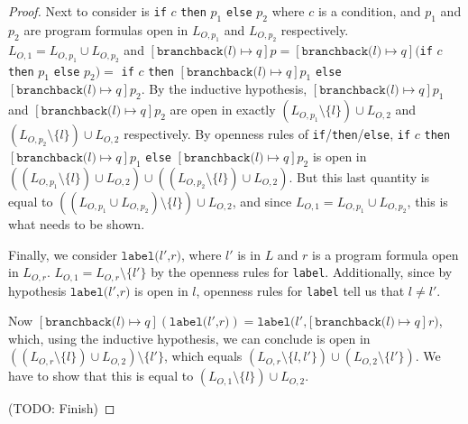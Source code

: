 \documentclass[11pt]{article}
\begin{document}
\begin{proof}
Next to consider is \texttt{if} $c$ \texttt{then} $p_{1}$ \texttt{else} $p_{2}$ where $c$ is a condition, and $p_{1}$ and $p_{2}$ are program formulas open in $L_{O,p_{1}}$ and $L_{O,p_{2}}$ respectively.  $L_{O,1} = L_{O,p_{1}} \cup L_{O,p_{2}}$ and $[\texttt{branchback(}l\texttt{)} \mapsto q]p = [\texttt{branchback(}l\texttt{)} \mapsto q]($\texttt{if} $c$ \texttt{then} $p_{1}$ \texttt{else} $p_{2}) = $ \texttt{if} $c$ \texttt{then} $[\texttt{branchback(}l\texttt{)} \mapsto q]p_{1}$ \texttt{else} $[\texttt{branchback(}l\texttt{)} \mapsto q]p_{2}$.  By the inductive hypothesis, $[\texttt{branchback(}l\texttt{)} \mapsto q]p_{1}$ and $[\texttt{branchback(}l\texttt{)} \mapsto q]p_{2}$ are open in exactly $(L_{O,p_{1}} \setminus \{l\}) \cup L_{O,2}$ and $(L_{O,p_{2}} \setminus \{l\}) \cup L_{O,2}$ respectively. By openness rules of \texttt{if}/\texttt{then}/\texttt{else}, \texttt{if} $c$ \texttt{then} $[\texttt{branchback(}l\texttt{)} \mapsto q]p_{1}$ \texttt{else} $[\texttt{branchback(}l\texttt{)} \mapsto q]p_{2}$ is open in $((L_{O,p_{1}} \setminus \{l\}) \cup L_{O,2}) \cup ((L_{O,p_{2}} \setminus \{l\}) \cup L_{O,2})$.  But this last quantity is equal to $((L_{O,p_{1}} \cup L_{O,p_{2}}) \setminus \{l\}) \cup L_{O,2}$, and since $L_{O,1} = L_{O,p_{1}} \cup L_{O,p_{2}}$, this is what needs to be shown.

Finally, we consider $\texttt{label(}l'\texttt{,} r\texttt{)}$, where $l'$ is in $L$ and $r$ is a program formula open in $L_{O,r}$.  $L_{O,1} = L_{O,r} \setminus \{l'\}$ by the openness rules for \texttt{label}. Additionally, since by hypothesis $\texttt{label(}l'\texttt{,} r\texttt{)}$ is open in $l$, openness rules for \texttt{label} tell us that $l \neq l'$.

Now $[\texttt{branchback(}l\texttt{)} \mapsto q](\texttt{label(}l'\texttt{,} r\texttt{)}) = \texttt{label(}l'\texttt{,} [\texttt{branchback(}l\texttt{)} \mapsto q]r\texttt{)}$, which, using the inductive hypothesis, we can conclude is open in $((L_{O,r} \setminus \{l\}) \cup L_{O,2}) \setminus \{l'\}$, which equals $(L_{O,r} \setminus \{l, l'\}) \cup (L_{O,2} \setminus \{l'\})$.  We have to show that this is equal to $(L_{O,1} \setminus \{l\}) \cup L_{O,2}$.

(TODO: Finish)
\end{proof}
\end{document}
